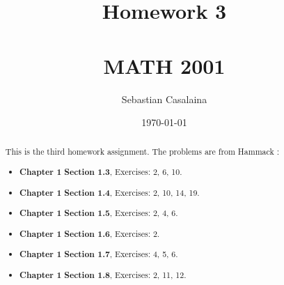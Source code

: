 \documentclass[12pt]{amsart}
\numberwithin{equation}{section}
\theoremstyle{definition}
\theoremstyle{remark}
\begin{document}




\author[Casalaina]{Sebastian Casalaina}
\address{University of Colorado, Department of Mathematics,  Campus Box 395,
Boulder, CO 80309-0395}
\date{\today}



\title[Homework 3]{Homework 3 \\ \ \\  MATH 2001}

\begin{abstract} 
This is the third homework assignment.  The problems are from Hammack \cite[Ch.~1, \S 1.3, \S 1.4, \S 1.5, \S 1.6 \S 1.7, \S 1.8]{H13}:
\begin{itemize}

\item \textbf{Chapter 1}  
\textbf{Section 1.3}, Exercises:  2, 6, 10.

\item \textbf{Chapter 1}  
\textbf{Section 1.4}, Exercises:  2, 10, 14, 19.

\item \textbf{Chapter 1}  
\textbf{Section 1.5}, Exercises:  2, 4, 6.

\item \textbf{Chapter 1}  
\textbf{Section 1.6}, Exercises:  2.

\item \textbf{Chapter 1}  
\textbf{Section 1.7}, Exercises:  4, 5, 6.

\item \textbf{Chapter 1}  
\textbf{Section 1.8}, Exercises:  2, 11, 12.

\end{itemize}
\end{abstract}


\maketitle


\tableofcontents

\end{document}
